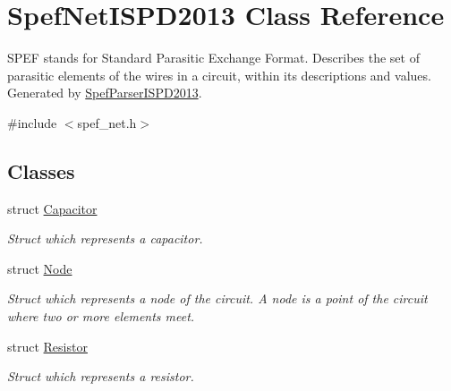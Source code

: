 \hypertarget{classSpefNetISPD2013}{\section{Spef\-Net\-I\-S\-P\-D2013 Class Reference}
\label{classSpefNetISPD2013}
}


S\-P\-E\-F stands for Standard Parasitic Exchange Format. Describes the set of parasitic elements of the wires in a circuit, within its descriptions and values. Generated by \hyperlink{classSpefParserISPD2013}{Spef\-Parser\-I\-S\-P\-D2013}.  




{\ttfamily \#include $<$spef\-\_\-net.\-h$>$}

\subsection*{Classes}
\begin{DoxyCompactItemize}
\item 
struct \hyperlink{structSpefNetISPD2013_1_1Capacitor}{Capacitor}
\begin{DoxyCompactList}\small\item\em Struct which represents a capacitor. \end{DoxyCompactList}\item 
struct \hyperlink{structSpefNetISPD2013_1_1Node}{Node}
\begin{DoxyCompactList}\small\item\em Struct which represents a node of the circuit. A node is a point of the circuit where two or more elements meet. \end{DoxyCompactList}\item 
struct \hyperlink{structSpefNetISPD2013_1_1Resistor}{Resistor}
\begin{DoxyCompactList}\small\item\em Struct which represents a resistor. \end{DoxyCompactList}\end{DoxyCompactItemize}

